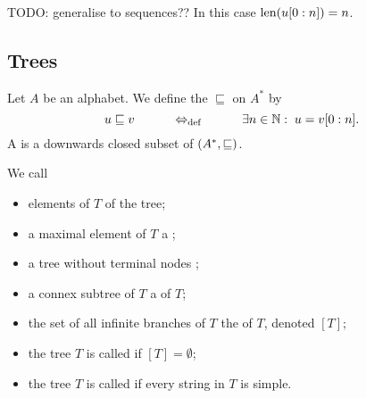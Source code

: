 TODO: generalise to sequences?? In this case $\operatorname{len}(u[0:n]) = n$.

\subsection{Trees}
\begin{definition}
Let $A$ be an alphabet. We define the  $\sqsubseteq$ on $A^*$ by
\[ u \sqsubseteq v \qquad\quad\Leftrightarrow_{\text{def}}\quad\qquad \exists n\in \mathbb{N}: \; u = v[0:n]. \]
A  is a downwards closed subset of $\sSet{A^*, \sqsubseteq}$.

We call
\begin{itemize}
\item elements of $T$  of the tree;
\item a maximal element of $T$ a ;
\item a tree without terminal nodes ;
\item a connex subtree of $T$ a  of $T$;
\item the set of all infinite branches of $T$ the  of $T$, denoted $[T]$;
\item the tree $T$ is called  if $[T] = \emptyset$;
\item the tree $T$ is called  if every string in $T$ is simple.
\end{itemize}
\end{definition}

